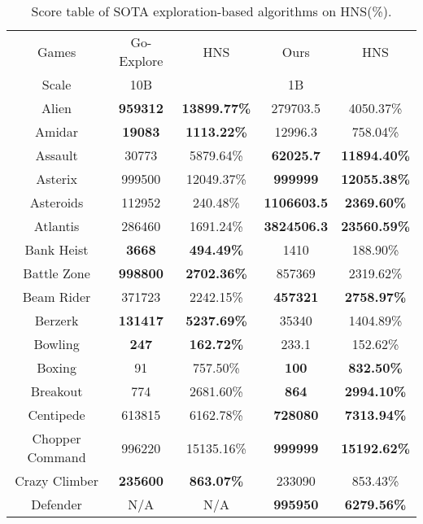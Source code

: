 \clearpage  
\begin{table}[!hb]
\footnotesize
\begin{center}
\caption{Score table of  SOTA exploration-based algorithms on HNS(\%).}
\label{Tab:Score table of SOTA  exploration-based algorithms on HNS.}
\setlength{\tabcolsep}{1.0pt}
\begin{tabular}{c cc cc }
\toprule
Games & Go-Explore & HNS & Ours & HNS   \\ 
        Scale & 10B & ~ & 1B &    \\  \midrule
                Alien & \textbf{959312} & \textbf{13899.77\%} & 279703.5 & 4050.37\% \\  
        Amidar & \textbf{19083} & \textbf{1113.22\%} & 12996.3 & 758.04\% \\  
        Assault & 30773 & 5879.64\% & \textbf{62025.7} & \textbf{11894.40\%} \\  
        Asterix & 999500 & 12049.37\% & \textbf{999999} & \textbf{12055.38\%} \\  
        Asteroids & 112952 & 240.48\% & \textbf{1106603.5} & \textbf{2369.60\%} \\  
        Atlantis & 286460 & 1691.24\% & \textbf{3824506.3} & \textbf{23560.59\%} \\  
        Bank Heist & \textbf{3668} & \textbf{494.49\%} & 1410 & 188.90\% \\  
        Battle Zone & \textbf{998800} & \textbf{2702.36\%} & 857369 & 2319.62\% \\  
        Beam Rider & 371723 & 2242.15\% & \textbf{457321} & \textbf{2758.97\%} \\  
        Berzerk & \textbf{131417} & \textbf{5237.69\%} & 35340 & 1404.89\% \\  
        Bowling & \textbf{247} & \textbf{162.72\%} & 233.1 & 152.62\% \\  
        Boxing & 91 & 757.50\% & \textbf{100} & \textbf{832.50\%} \\  
        Breakout & 774 & 2681.60\% & \textbf{864} & \textbf{2994.10\%} \\  
        Centipede & 613815 & 6162.78\% & \textbf{728080} & \textbf{7313.94\%} \\  
        Chopper Command & 996220 & 15135.16\% & \textbf{999999} & \textbf{15192.62\%} \\  
        Crazy Climber & \textbf{235600} & \textbf{863.07\%} & 233090 & 853.43\% \\  
        Defender & N/A & N/A & \textbf{995950} & \textbf{6279.56\%} \\  

\end{tabular}
\end{center}
\end{table}
